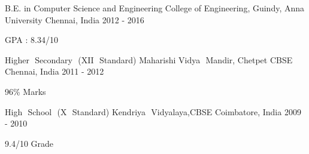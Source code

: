 

\begin{cventries}

  \begin{adjustwidth}{1.5mm}{0mm}
  \cventry
    {B.E. in Computer Science and Engineering} %
    {College of Engineering, Guindy, Anna University} %
    {Chennai, India} %
    {2012 - 2016} %
    {
      \begin{cvitems} %
        \item {GPA : 8.34/10}
      \end{cvitems}
    }
  \end{adjustwidth}
  \begin{adjustwidth}{1.5mm}{0mm}
  \cventry
    {Higher​ ​ Secondary​ ​ (XII​ ​ Standard)} %
    {Maharishi​ ​ Vidya​ ​ Mandir,​ Chetpet​ CBSE} %
    {Chennai, India} %
    {2011 - 2012} %
    {
      \begin{cvitems} %
        \item {96\% Marks}
      \end{cvitems}
    }
  \end{adjustwidth}
  \begin{adjustwidth}{1.5mm}{0mm}
  \cventry
    {High​ ​ School​ ​ (X​ ​ Standard)} %
    {Kendriya​ ​ Vidyalaya,​​ CBSE} %
    {Coimbatore, India} %
    {2009 - 2010} %
    {
      \begin{cvitems} %
        \item {9.4/10 Grade}
      \end{cvitems}
    }
  \end{adjustwidth}
\end{cventries}
